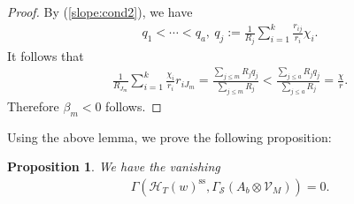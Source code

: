 \documentclass[11pt,oneside,a4paper,mathscr]{amsart}
\newtheorem{prop}[thm]{Proposition}
\theoremstyle{definition}
\renewcommand{\leq}{\leqslant}
\newcommand{\cS}{\mathcal{S}}
\newcommand{\cH}{\mathcal{H}}
\begin{document}
\begin{proof}
By (\ref{slope:cond2}), we have 
\begin{align}\label{ineq:q}
    q_1<\cdots<q_a, \ q_j:=\frac{1}{R_j}\sum_{i=1}^k \frac{r_{ij}}{r_i}\chi_i.
\end{align}
It follows that 
\begin{align*}
    \frac{1}{R_{J_m}}\sum_{i=1}^k \frac{\chi_i}{r_i}r_{i J_m}=\frac{\sum_{j\leq m}R_j q_j}{\sum_{j\leq m}R_j}<\frac{\sum_{j\leq a}R_j q_j}{\sum_{j\leq a}R_j}=\frac{\chi}{r}.
\end{align*}
Therefore $\beta_m<0$ follows. 
\end{proof}

Using the above lemma, we prove the following proposition: 
\begin{prop}\label{prop:vanishing}
We have the vanishing 
\begin{align}\label{vanish:Gamma}
    \Gamma(\cH_T(w)^{\mathrm{ss}}, \Gamma_{\cS}(A_b \otimes \mathcal{V}_M))=0. 
\end{align}
\end{prop}
\end{document}
